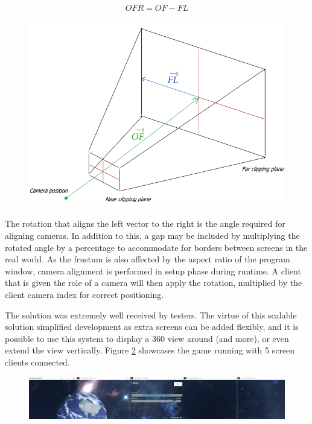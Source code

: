 \documentclass[a4paper,11pt]{article}
\begin{document}
\begin{equation}
	OFR = OF - FL \label{eq:origin_far_right}
\end{equation}

\begin{figure}[ht]
	\centering
	\includegraphics[scale=0.4]{images/frustum}
    \label{fig:frustum}
\end{figure}

The rotation that aligns the left vector to the right is the angle required for aligning cameras. In addition to this, a gap may be included by multiplying the rotated angle by a percentage to accommodate for  borders between screens in the real world. As the frustum is also affected by the aspect ratio of the program window, camera alignment is performed in setup phase during runtime. A client that is given the role of a camera will then apply the rotation, multiplied by the client camera index for correct positioning.

The solution was extremely well received by testers. The virtue of this scalable solution simplified development as extra screens can be added flexibly, and it is possible to use this system to display a 360 view around (and more), or even extend the view vertically. Figure \ref{fig:cameras} showcases the game running with 5 screen clients connected.

\begin{figure}[ht]
	\centering
	\includegraphics[width=\textwidth]{images/cameras}
    \label{fig:cameras}
\end{figure}
\end{document}
